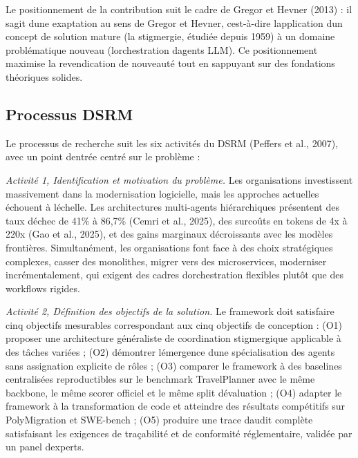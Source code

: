 \documentclass[12pt,a4paper]{article}
\begin{document}
Le positionnement de la contribution suit le cadre de Gregor et Hevner
(2013) : il s\textquotesingle agit d\textquotesingle une exaptation
au sens de Gregor et Hevner,
c\textquotesingle est-à-dire l\textquotesingle application d\textquotesingle un
concept de solution mature (la stigmergie, étudiée depuis 1959) à un
domaine problématique nouveau (l\textquotesingle orchestration
d\textquotesingle agents LLM). Ce positionnement maximise la
revendication de nouveauté tout en s\textquotesingle appuyant sur des
fondations théoriques solides.

\subsection{Processus DSRM}\label{processus-dsrm}

Le processus de recherche suit les six activités du DSRM (Peffers et al.,
2007), avec un point d\textquotesingle entrée centré sur le problème :

\emph{Activité 1, Identification et motivation du problème.}
Les organisations investissent massivement dans la modernisation logicielle,
mais les approches actuelles échouent à l\textquotesingle échelle. Les
architectures multi-agents hiérarchiques présentent des taux
d\textquotesingle échec de 41\% à 86,7\% (Cemri et al., 2025), des surcoûts
en tokens de 4x à 220x (Gao et al., 2025), et des gains marginaux
décroissants avec les modèles frontières. Simultanément, les organisations
font face à des choix stratégiques complexes, casser des monolithes,
migrer vers des microservices, moderniser incrémentalement, qui
exigent des cadres d\textquotesingle orchestration flexibles plutôt que
des workflows rigides.

\emph{Activité 2, Définition des objectifs de la solution.}
Le framework doit satisfaire cinq objectifs mesurables correspondant aux
cinq objectifs de conception : (O1) proposer une architecture
généraliste de coordination stigmergique applicable à des tâches variées ;
(O2) démontrer l\textquotesingle émergence d\textquotesingle une
spécialisation des agents sans assignation explicite de rôles ;
(O3) comparer le framework à des baselines centralisées reproductibles
sur le benchmark TravelPlanner avec le même backbone, le même scorer
officiel et le même split d\textquotesingle évaluation ;
(O4) adapter le framework à la transformation de code et atteindre des
résultats compétitifs sur PolyMigration et SWE-bench ;
(O5) produire une trace d\textquotesingle audit complète satisfaisant
les exigences de traçabilité et de conformité réglementaire, validée
par un panel d\textquotesingle experts.
\end{document}
